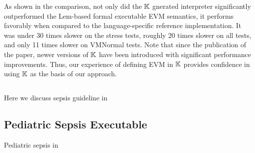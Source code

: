 As shown in the comparison, not only did the $\mathbb{K}$ gnerated interpreter significantly
outperformed the Lem-based formal executable EVM semantics, it performs
favorably when compared to the language-specific reference implementation.
It was under 30 times slower on the stress tests, roughly 20 times
slower on all tests, and only 11 times slower on VMNormal tests.
Note that since the publication of the paper, newer versions
of $\mathbb{K}$ have been introduced with significant performance improvements.
Thus, our experience of defining EVM in $\mathbb{K}{}$ provides confidence
in using $\mathbb{K}$ as the basis of our approach.

\subsection{\MediK{}}\label{subsec:medik}
Here we discuss sepsis guideline in \MediK{}


\subsection{Pediatric Sepsis Executable \BPG{}}\label{subsec:sepsis-cdss}
Pediatric sepsis \CDSS{} in \MediK{}

